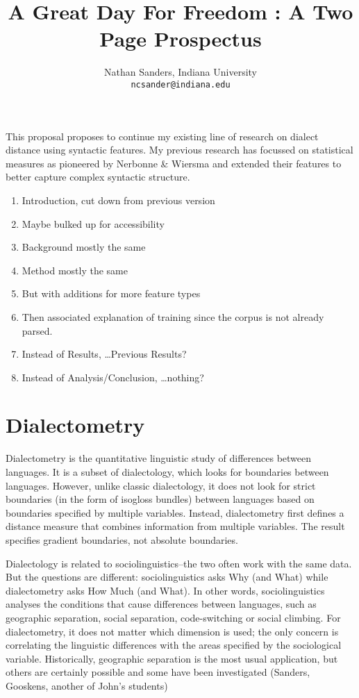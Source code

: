 \documentclass[11pt]{article}
\author{Nathan Sanders, Indiana University \\ \tt{ncsander@indiana.edu}}
\title{A Great Day For Freedom : A Two Page Prospectus}
\begin{document}
\maketitle
This proposal proposes to continue my existing line of research on
dialect distance using syntactic features. My previous research has
focussed on statistical measures as pioneered by Nerbonne \& Wiersma
and extended their features to better capture complex syntactic
structure.
\begin{enumerate}
\item Introduction, cut down from previous version
\item Maybe bulked up for accessibility
\item Background mostly the same
\item Method mostly the same
\item But with additions for more feature types
\item Then associated explanation of training since the corpus is not
  already parsed.
\item Instead of Results, \ldots Previous Results?
\item Instead of Analysis/Conclusion, \ldots nothing?
\end{enumerate}

\section{Dialectometry}

Dialectometry is the quantitative linguistic study of differences
between languages. It is a subset of dialectology, which looks for
boundaries between languages. However, unlike classic dialectology, it
does not look for strict boundaries (in the form of isogloss bundles)
between languages based on boundaries specified by multiple
variables. Instead, dialectometry first defines a distance measure
that combines information from multiple variables. The result
specifies gradient boundaries, not absolute boundaries.

Dialectology is related to sociolinguistics--the two often work with
the same data. But the questions are different: sociolinguistics asks
Why (and What) while dialectometry asks How Much (and What).
In other words, sociolinguistics analyses the conditions that cause
differences between languages, such as geographic separation, social
separation, code-switching or social climbing. For dialectometry, it
does not matter which dimension is used; the only concern is correlating
the linguistic differences with the areas specified by the
sociological variable. Historically, geographic separation is the most
usual application, but others are certainly possible and some have
been investigated (Sanders, Gooskens, another of John's students)
\end{document}
